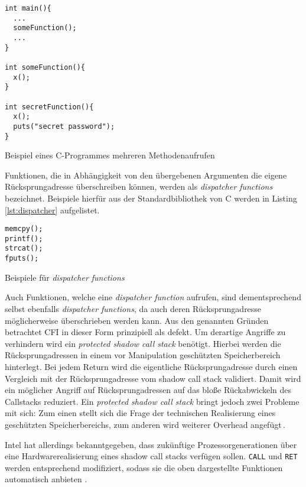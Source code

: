 \documentclass[12pt,%
               oneside,
               a4paper]{uiothesis}
\begin{document}
\begin{listing}
\begin{verbatim}
int main(){
  ...
  someFunction();
  ...
}

int someFunction(){
  x();
}

int secretFunction(){
  x();
  puts("secret password");
}
\end{verbatim}
\caption{Beispiel eines C-Programmes mehreren Methodenaufrufen}
\label{lst:c_many_printf}
\end{listing}

Funktionen, die in Abhängigkeit von den übergebenen Argumenten die eigene Rücksprungadresse überschreiben können, werden als \emph{dispatcher functions} bezeichnet. Beispiele hierfür aus der Standardbibliothek von C werden in Listing \ref{lst:dispatcher} aufgelistet.
\begin{listing}
\begin{verbatim}
memcpy();
printf();
strcat();
fputs();
\end{verbatim}
\caption{Beispiele für \emph{dispatcher functions}}
\label{lst:dispatcher}
\end{listing}
Auch Funktionen, welche eine \emph{dispatcher function} aufrufen, sind dementsprechend selbst ebenfalls \emph{dispatcher functions}, da auch deren Rücksprungadresse möglicherweise überschrieben werden kann. Aus den genannten Gründen betrachtet \cite[S. 167]{Carlini.2015} CFI in dieser Form prinzipiell als defekt. Um derartige Angriffe zu verhindern wird ein \emph{protected shadow call stack} benötigt. Hierbei werden die Rücksprungadressen in einem vor Manipulation geschützten Speicherbereich hinterlegt. Bei jedem Return wird die eigentliche Rücksprungadresse durch einen Vergleich mit der Rücksprungadresse vom shadow call stack validiert. Damit wird ein möglicher Angriff auf Rücksprungadressen auf das bloße Rückabwickeln des Callstacks reduziert. Ein \emph{protected shadow call stack} bringt jedoch zwei Probleme mit sich: Zum einen stellt sich die Frage der technischen Realisierung eines geschützten Speicherbereichs, zum anderen wird weiterer Overhead angefügt\,\cite[S.164]{Carlini.2015}.

Intel hat allerdings bekanntgegeben, dass zukünftige Prozessorgenerationen über eine Hardwarerealisierung eines shadow call stacks verfügen sollen. \texttt{CALL} und \texttt{RET} werden entsprechend modifiziert, sodass sie die oben dargestellte Funktionen automatisch anbieten \cite{Intel.2016}.

\end{document}
